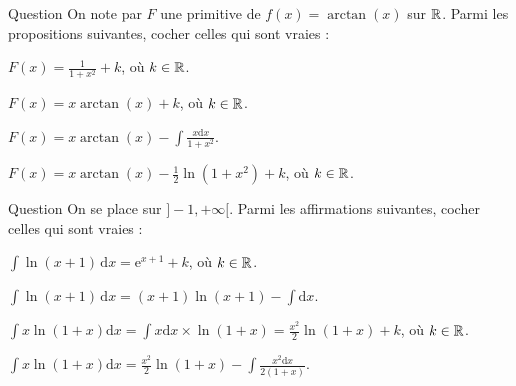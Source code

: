 \begin{multi}[multiple,feedback=
{Une intégration par parties avec \(u=\arctan (x)\) et \(v=x\) donne
\[\int \arctan (x)\mathrm{d}x=x\arctan (x)-\int \frac{x\mathrm{d}x}{1+x^2}=x\arctan (x)-\frac{1}{2}\ln (1+x^2)+k,\; k\in \Rr.\]
}]{Question}
On note par \(F\) une primitive de \(f(x)=\arctan (x)\) sur \(\mathbb{R}\). Parmi les propositions suivantes, cocher celles qui sont vraies :

    \item \(\displaystyle F(x)=\frac{1}{1+x^2}+k\), où \(k\in \mathbb{R}\).
    \item \(\displaystyle F(x)=x\arctan (x)+k\), où \(k\in \mathbb{R}\).
    \item* \(\displaystyle F(x)=x\arctan (x)-\int \frac{x\mathrm{d}x}{1+x^2}\).
    \item* \(\displaystyle F(x)=x\arctan (x)-\frac{1}{2}\ln (1+x^2)+k\), où \(k\in \mathbb{R}\).
\end{multi}


\begin{multi}[multiple,feedback=
{Une intégration par parties avec \(u=\ln (x+1)\) et \(v=x+1\) donne
\[\int \ln (x+1)\, \mathrm{d}x=(x+1)\ln (x+1)-\int \mathrm{d}x=(x+1)\ln (x+1)-x+k,\; k\in \Rr.\]
Une intégration par parties avec \(u=\ln (x+1)\) et \(v=x^2/2\) donne
\[\int x\ln (1+x)\mathrm{d}x=\frac{x^2}{2}\ln (1+x)-\int \frac{x^2\mathrm{d}x}{2(1+x)}.\]
}]{Question}
On se place sur \(]-1,+\infty[\). Parmi les affirmations suivantes, cocher celles qui sont vraies :

    \item \(\displaystyle \int \ln (x+1)\, \mathrm{d}x=\mathrm{e}^{x+1}+k\), où \(k\in \mathbb{R}\).
    \item* \(\displaystyle \int \ln (x+1)\, \mathrm{d}x=(x+1)\ln (x+1)-\int \mathrm{d}x\).
    \item \(\displaystyle \int x\ln (1+x)\mathrm{d}x=\int x\mathrm{d}x\times\ln (1+x)=\frac{x^2}{2}\ln (1+x)+k\), où \(k\in \mathbb{R}\).
    \item* \(\displaystyle \int x\ln (1+x)\mathrm{d}x=\frac{x^2}{2}\ln (1+x)-\int \frac{x^2\mathrm{d}x}{2(1+x)}\).
\end{multi}


